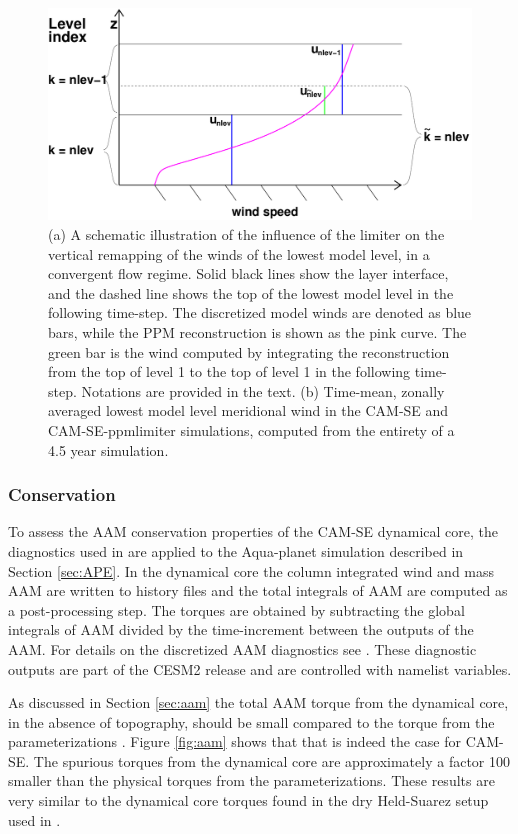 \documentclass{agujournal}
\begin{document}
\begin{figure}[h]
\centering
\includegraphics[width=30pc]{figs/schematic.pdf}
\caption{(a) A schematic illustration of the influence of the limiter on the vertical remapping of the winds of the lowest model level, in a convergent flow regime. Solid black lines show the layer interface, and the dashed line shows the top of the lowest model level in the following time-step. The discretized model winds are denoted as blue bars, while the PPM reconstruction is shown as the pink curve. The green bar is the wind computed by integrating the reconstruction from the top of level 1 to the top of level 1 in the following time-step. Notations are provided in the text. (b) Time-mean, zonally averaged lowest model level meridional wind in the CAM-SE and CAM-SE-ppmlimiter simulations, computed from the entirety of a 4.5 year simulation.}
\label{fig:schematic}
\end{figure}

\subsubsection{Conservation}
To assess the AAM conservation properties of the CAM-SE dynamical core, the diagnostics used in \cite{LBDL2014JAMES} are applied to the Aqua-planet simulation described in Section \ref{sec:APE}. In the dynamical core the column integrated wind and mass AAM are written to history files and the total integrals of AAM are computed as a post-processing step. The torques are obtained by subtracting the global integrals of AAM divided by the time-increment between the outputs of the AAM. For details on the discretized AAM diagnostics see \cite{LBDL2014JAMES}. These diagnostic outputs are part of the CESM2 release and are controlled with namelist variables.

As discussed in Section \ref{sec:aam} the total AAM torque from the dynamical core, in the absence of topography, should be small {\color{red}{(ideally zero)}} compared to the torque from the parameterizations {\color{red}{which is not spurious}}. Figure \ref{fig:aam} shows that that is indeed the case for CAM-SE. The spurious torques from the dynamical core are approximately a factor 100 smaller than the physical torques from the parameterizations. These results are very similar to the dynamical core torques found in the dry Held-Suarez setup used in \citet{LBDL2014JAMES}.
\end{document}
